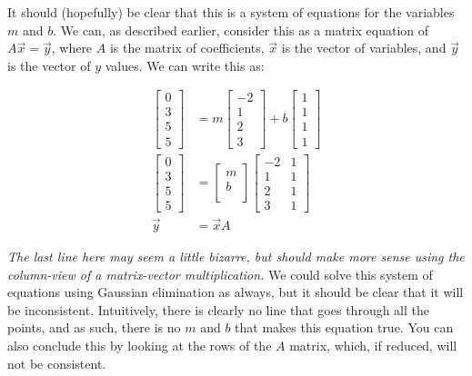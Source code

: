 \documentclass[12pt]{article}
\begin{document}
It should (hopefully) be clear that this is a system of equations for the variables $m$ and $b$. We can, as described earlier, consider this as a matrix equation of $A\vec{x} = \vec{y}$, where $A$ is the matrix of coefficients, $\vec{x}$ is the vector of variables, and $\vec{y}$ is the vector of $y$ values. We can write this as:

\begin{equation}
    \begin{split}
        \begin{bmatrix}
            0\\
            3\\
            5\\
            5
        \end{bmatrix} &= m \begin{bmatrix}
            -2\\
            1\\
            2\\
            3
        \end{bmatrix} + b \begin{bmatrix}
            1\\
            1\\
            1\\
            1
        \end{bmatrix}\\
        \begin{bmatrix}
            0\\
            3\\
            5\\
            5
        \end{bmatrix} &= \begin{bmatrix}
            m\\
            b\\
        \end{bmatrix} \begin{bmatrix}
            -2 & 1\\
            1 & 1\\
            2 & 1\\
            3 & 1
        \end{bmatrix}\\
        \vec{y} &= \vec{x}A
    \end{split}
\end{equation}

\textit{The last line here may seem a little bizarre, but should make more sense using the column-view of a matrix-vector multiplication.} We could solve this system of equations using Gaussian elimination as always, but it should be clear that it will be inconsistent. Intuitively, there is clearly no line that goes through all the points, and as such, there is no $m$ and $b$ that makes this equation true. You can also conclude this by looking at the rows of the $A$ matrix, which, if reduced, will not be consistent.
\end{document}

